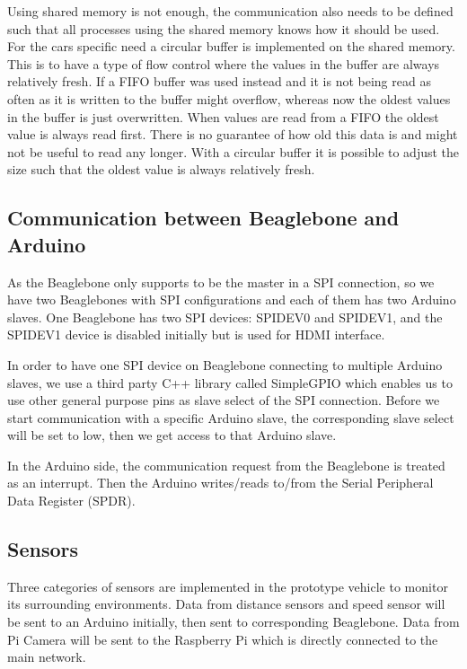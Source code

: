 \documentclass[11pt, titlepage]{article} %
\begin{document}
Using shared memory is not enough, the communication also needs to be defined such that all processes using the shared memory knows how it should be used. For the cars specific need a circular buffer is implemented on the shared memory. This is to have a type of flow control where the values in the buffer are always relatively fresh. If a FIFO buffer was used instead and it is not being read as often as it is written to  the buffer might overflow, whereas now the oldest values in the buffer is just overwritten. When values are read from a FIFO the oldest value is always read first. There is no guarantee of how old this data is and might not be useful to read any longer. With a circular buffer it is possible to adjust the size such that the oldest value is always relatively fresh.


\subsection{Communication between Beaglebone and Arduino}

As the Beaglebone only supports to be the master in a SPI connection, so we have two Beaglebones with SPI configurations and each of them has two Arduino slaves. One Beaglebone has two SPI devices: SPIDEV0 and SPIDEV1, and the SPIDEV1 device is disabled initially but is used for HDMI interface. 

In order to have one SPI device on Beaglebone connecting to multiple Arduino slaves, we use a third party C++ library called SimpleGPIO which enables us to use other general purpose pins as slave select of the SPI connection. Before we start communication with a specific Arduino slave, the corresponding slave select will be set to low, then we get access to that Arduino slave.

In the Arduino side, the communication request from the Beaglebone is treated as an interrupt. Then the Arduino writes/reads to/from the Serial Peripheral Data Register (SPDR). 
\subsection{Sensors}
Three categories of sensors are implemented in the prototype vehicle to monitor its surrounding environments. Data from distance sensors and speed sensor will be sent to an Arduino initially, then sent to corresponding Beaglebone. Data from Pi Camera will be sent to the Raspberry Pi which is directly connected to the main network.
\end{document}
